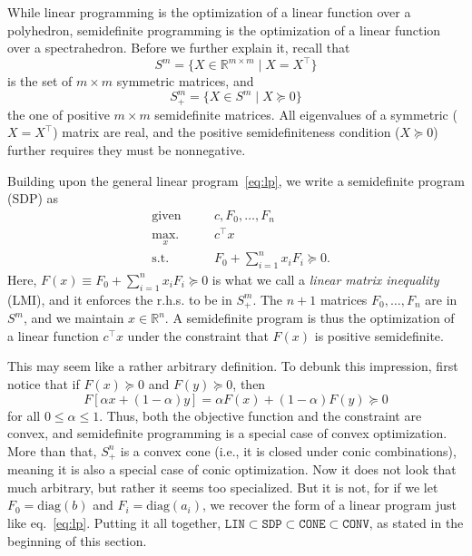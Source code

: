 			While linear programming is the optimization of a linear function over a polyhedron, semidefinite programming is the optimization of a linear function over a spectrahedron. Before we further explain it, recall that
			$$
				S^m = \{ X \in \mathbb{R}^{m \times m} \mid X = X^\intercal \}
			$$
			is the set of $m \times m$ symmetric matrices, and
			$$
				S_+^m = \{ X \in S^m \mid X \succeq 0 \}
			$$
			the one of positive $m \times m$ semidefinite matrices. All eigenvalues of a symmetric ($X = X^\intercal$) matrix are real, and the positive semidefiniteness condition ($X \succeq 0$) further requires they must be nonnegative.

			Building upon the general linear program~\eqref{eq:lp}, we write a semidefinite program (SDP) as
			\begin{subequations}
				\begin{alignat}{2}
					&\text{given}    &\quad & c, F_0, \ldots, F_n \\
					&\underset{x}{\text{max.}}   &	  & c^\intercal x \\
					&\text{s.t.}    &      & F_0 + \sum_{i=1}^n x_i F_i \succeq 0 .
				\end{alignat}
				\label{eq:sdp}
			\end{subequations}
			Here, $F(x) \equiv F_0 + \sum_{i=1}^n x_i F_i \succeq 0$ is what we call a \emph{linear matrix inequality} (LMI), and it enforces the r.h.s. to be in $S_+^m$. The $n + 1$ matrices $F_0, \ldots, F_n$ are in $S^m$, and we maintain $x \in \mathbb{R}^n$. A semidefinite program is thus the optimization of a linear function $c^\intercal x$ under the constraint that $F(x)$ is positive semidefinite.

			This may seem like a rather arbitrary definition. To debunk this impression, first notice that if $F(x) \succeq 0$ and $F(y) \succeq 0$, then
			$$
				F[ \alpha x + (1 - \alpha) y ] = \alpha F(x) + (1- \alpha) F(y) \succeq 0
			$$
			for all $0 \leq \alpha \leq 1$. Thus, both the objective function and the constraint are convex, and semidefinite programming is a special case of convex optimization. More than that, $S_+^n$ is a convex cone (i.e., it is closed under conic combinations), meaning it is also a special case of conic optimization. Now it does not look that much arbitrary, but rather it seems too specialized. But it is not, for if we let $F_0 = \text{diag}(b)$ and $F_i = \text{diag}(a_i)$, we recover the form of a linear program just like eq.~\eqref{eq:lp}. Putting it all together, $\texttt{LIN} \subset \texttt{SDP} \subset \texttt{CONE} \subset \texttt{CONV}$, as stated in the beginning of this section.

